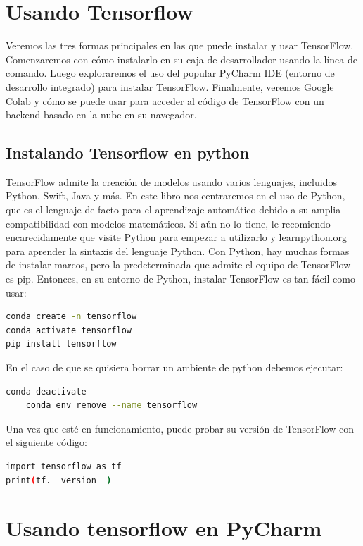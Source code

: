 \section{Usando Tensorflow}

Veremos las tres formas principales en las que puede instalar y usar TensorFlow. Comenzaremos con cómo instalarlo en su caja de desarrollador usando la línea de comando. Luego exploraremos el uso del popular PyCharm IDE (entorno de desarrollo integrado) para instalar TensorFlow. Finalmente, veremos Google Colab y cómo se puede usar para acceder al código de TensorFlow con un backend basado en la nube en su navegador.


\subsection{Instalando Tensorflow en python}


TensorFlow admite la creación de modelos usando varios lenguajes, incluidos Python, Swift, Java y más. En este libro nos centraremos en el uso de Python, que es el lenguaje de facto para el aprendizaje automático debido a su amplia compatibilidad con modelos matemáticos. Si aún no lo tiene, le recomiendo encarecidamente que visite Python para empezar a utilizarlo y learnpython.org para aprender la sintaxis del lenguaje Python. Con Python, hay muchas formas de instalar marcos, pero la predeterminada que admite el equipo de TensorFlow es pip. Entonces, en su entorno de Python, instalar TensorFlow es tan fácil como usar:

\begin{lstlisting}[language=bash]
conda create -n tensorflow
conda activate tensorflow
pip install tensorflow
\end{lstlisting}

En el caso de que se quisiera borrar un ambiente de python debemos ejecutar:

\begin{lstlisting}[language=bash]
	conda deactivate
	conda env remove --name tensorflow
\end{lstlisting}

Una vez que esté en funcionamiento, puede probar su versión de TensorFlow con el siguiente código:

\begin{lstlisting}[language=bash]
import tensorflow as tf
print(tf.__version__)
\end{lstlisting}

\section{Usando tensorflow en PyCharm}

